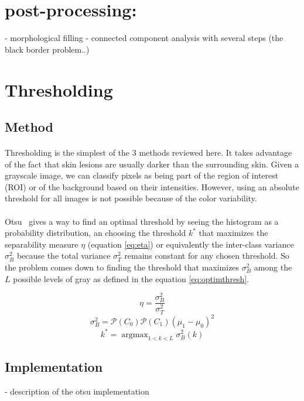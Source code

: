 \documentclass[a4paper,10pt]{article}
\DeclareMathOperator*{\argmax}{argmax}
\begin{document}
\section{post-processing:}
- morphological filling
- connected component analysis with several steps (the black border problem..)

\section{Thresholding}
\subsection{Method}
\paragraph{}
Thresholding is the simplest of the 3 methods reviewed here. It takes advantage of the fact that skin lesions are 
usually darker than the surrounding skin. Given a grayscale image, we can 
classify pixels as being part of the region of interest (ROI) or of the 
background based on their intensities. However, using an absolute threshold for all images is not possible because of the color variability. 
\paragraph{} Otsu~\cite{Otsu1979} 
gives a way to find an optimal threshold by seeing the histogram as a probability distribution, an choosing the threshold $k^*$ that maximizes the separability measure $\eta$ (equation \ref{eq:eta}) or equivalently the inter-class variance $\sigma_B^2$ because the total variance $\sigma_T^2$ remains constant for any chosen threshold. So the problem comes down to finding the threshold that maximizes $\sigma_B^2$ among the $L$ possible levels of gray as defined in the equation \ref{eq:optimthresh}. 

\begin{equation} \label{eq:eta}
\eta=\frac{\sigma_B^2}{\sigma_T^2} 
\end{equation}
$$
\sigma_B^2=\mathcal{P}(C_0)\mathcal{P}(C_1)(\mu_1-\mu_0)^2
$$
\begin{equation} \label{eq:optimthresh}
  k^* = \argmax_{1<k<L} \sigma_B^2(k)   
\end{equation}

\subsection{Implementation}
- description of the otsu implementation
\end{document}
